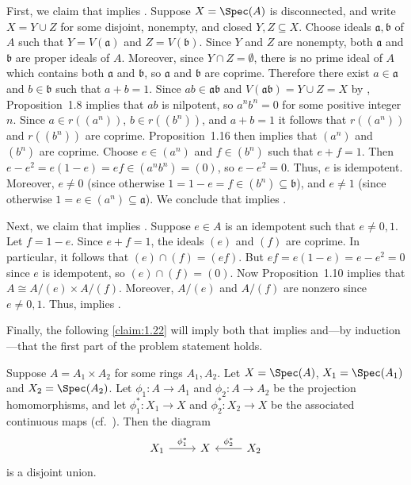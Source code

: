 \begin{solution}
First, we claim that  implies .
Suppose \(X = \Spec(A)\) is disconnected, and write \(X = Y \cup Z\) for some disjoint, nonempty, and closed \(Y, Z \subseteq X\).
Choose ideals \(\mathfrak{a}, \mathfrak{b}\) of \(A\) such that \(Y = V(\mathfrak{a})\) and \(Z = V(\mathfrak{b})\).
Since \(Y\) and \(Z\) are nonempty, both \(\mathfrak{a}\) and \(\mathfrak{b}\) are proper ideals of \(A\).
Moreover, since \(Y \cap Z = \emptyset\), there is no prime ideal of \(A\) which contains both \(\mathfrak{a}\) and \(\mathfrak{b}\), so \(\mathfrak{a}\) and \(\mathfrak{b}\) are coprime.
Therefore there exist \(a \in \mathfrak{a}\) and \(b \in \mathfrak{b}\) such that \(a + b = 1\).
Since \(a b \in \mathfrak{a} \mathfrak{b}\) and \(V(\mathfrak{a} \mathfrak{b}) = Y \cup Z = X\) by , Proposition~1.8 implies that \(a b\) is nilpotent, so \(a^n b^n = 0\) for some positive integer \(n\).
Since \(a \in r((a^n))\), \(b \in r((b^n))\), and \(a + b = 1\) it follows that \(r((a^n))\) and \(r((b^n))\) are coprime.
Proposition~1.16 then implies that \((a^n)\) and \((b^n)\) are coprime.
Choose \(e \in (a^n)\) and \(f \in (b^n)\) such that \(e + f = 1\).
Then \(e - e^2 = e (1 - e) = e f \in (a^n b^n) = (0)\), so \(e - e^2 = 0\).
Thus, \(e\) is idempotent.
Moreover, \(e \neq 0\) (since otherwise \(1 = 1 - e = f \in (b^n) \subseteq \mathfrak{b}\)), and \(e \neq 1\) (since otherwise \(1 = e \in (a^n) \subseteq \mathfrak{a}\)).
We conclude that  implies .

Next, we claim that  implies .
Suppose \(e \in A\) is an idempotent such that \(e \neq 0, 1\).
Let \(f = 1 - e\).
Since \(e + f = 1\), the ideals \((e)\) and \((f)\) are coprime.
In particular, it follows that \((e) \cap (f) = (e f)\).
But \(e f = e (1 - e) = e - e^2 = 0\) since \(e\) is idempotent, so \((e) \cap (f) = (0)\).
Now Proposition~1.10 implies that \(A \cong A / (e) \times A / (f)\).
Moreover, \(A / (e)\) and \(A / (f)\) are nonzero since \(e \neq 0, 1\).
Thus,  implies .

Finally, the following \autoref{claim:1.22} will imply both that  implies  and---by induction---that the first part of the problem statement holds.
\end{solution}

\begin{claim}
\label{claim:1.22}
Suppose \(A = A_1 \times A_2\) for some rings \(A_1, A_2\).
Let \(X = \Spec(A)\), \(X_1 = \Spec(A_1)\) and \(X_2 = \Spec(A_2)\).
Let \(\phi_1 : A \to A_1\) and \(\phi_2 : A \to A_2\) be the projection homomorphisms, and let \(\phi_1^* : X_1 \to X\) and \(\phi_2^* : X_2 \to X\) be the associated continuous maps (cf.~).
Then the diagram
\begin{equation*}
\begin{tikzcd}
X_1 \arrow[r, "\phi_1^*"] & X & \arrow[l, "\phi_2^*"'] X_2
\end{tikzcd}
\end{equation*}
is a disjoint union.
\end{claim}


